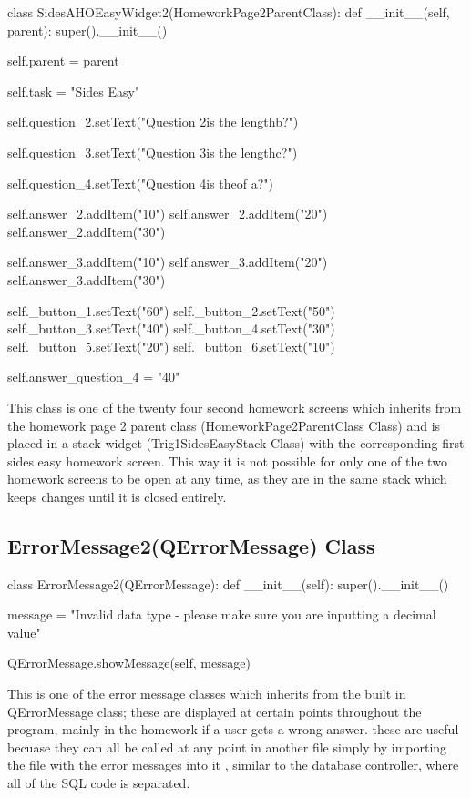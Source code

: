 \begin{python}
class SidesAHOEasyWidget2(HomeworkPage2ParentClass):
    def __init__(self, parent):
        super().__init__()

        self.parent = parent

        self.task = "Sides Easy"

        self.question_2.setText("Question 2\nWhat is the length\nof b?")
        
        self.question_3.setText("Question 3\nWhat is the length\nof c?")
        
        self.question_4.setText("Question 4\nWhat is the\nlength of a?")

        self.answer_2.addItem("10")
        self.answer_2.addItem("20")
        self.answer_2.addItem("30")

        self.answer_3.addItem("10")
        self.answer_3.addItem("20")
        self.answer_3.addItem("30")

        self._button_1.setText("60")
        self._button_2.setText("50")
        self._button_3.setText("40")
        self._button_4.setText("30")
        self._button_5.setText("20")
        self._button_6.setText("10")

        self.answer_question_4 = "40"
\end{python}

This class is one of the twenty four second homework screens which inherits from the homework page 2 parent class (HomeworkPage2ParentClass Class) and is placed in a stack widget (Trig1SidesEasyStack Class) with the corresponding first sides easy homework screen. This way it is not possible for only one of the two homework screens to be open at any time, as they are in the same stack which keeps changes until it is closed entirely.

\subsection{ErrorMessage2(QErrorMessage) Class}

\begin{python}
class ErrorMessage2(QErrorMessage):
    def __init__(self):
        super().__init__()
        
        message = "Invalid data type - please make sure you are inputting a decimal value"

        QErrorMessage.showMessage(self, message)
\end{python}

This is one of the error message classes which inherits from the built in QErrorMessage class; these are displayed at certain points throughout the program, mainly in the homework if a user gets a wrong answer. these are useful becuase they can all be called at any point in another file simply by importing the file with the error messages into it , similar to the database controller, where all of the SQL code is separated.

